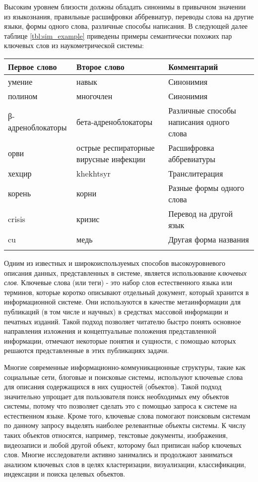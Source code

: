 Высоким уровнем близости должны обладать синонимы в привычном значении из языкознания, правильные расшифровки аббревиатур, переводы слова на другие языки, формы одного слова, различные способы написания. В следующей далее таблице \ref{tbl:sim_example} приведены примеры семантически похожих пар ключевых слов из наукометрической системы:
\begin{tabularx}{16cm}{|X|X|X|}
        \hline
        Первое слово & Второе слово & Комментарий \\ \hline
        умение & навык & Синонимия \\ \hline
        полином & многочлен & Синонимия \\ \hline
        β-адреноблокаторы & бета-адреноблокаторы & Различные способы написания одного слова \\ \hline
        орви & острые респираторные вирусные инфекции & Расшифровка аббревиатуры \\ \hline
        хехцир & khekhtsyr & Транслитерация \\ \hline
        корень & корни & Разные формы одного слова \\ \hline
        crisis & кризис & Перевод на другой язык \\ \hline
        cu & медь & Другая форма названия \\ \hline
\caption{Примеры семантически близких ключевых слов} \label{tbl:tuple_test}
        \label{tbl:sim_example}
\end{tabularx}

Одним из известных и широкоиспользуемых способов высокоуровневого описания данных, представленных в системе, является использование \emph{ключевых слов}. Ключевые слова (или теги) - это набор слов естественного языка или терминов, которые коротко описывают отдельный документ, который хранится в информационной системе. Они используются в качестве метаинформации для публикаций (в том числе и научных) в средствах массовой информации и печатных изданий. Такой подход позволяет читателю быстро понять основное направления изложения и концептуальные положения представленной информации, отмечают некоторые понятия и сущности, с помощью которых решаются представленные в этих публикациях задачи. 

Многие современные информационно-коммуникационные структуры, такие как социальные сети, блоговые и поисковые системы, используют ключевые слова для описания содержащихся в них сущностей (объектов). Такой подход значительно упрощает для пользователя поиск необходимых ему объектов системы, потому что позволяет сделать это с помощью запроса к системе на естественном языке. Кроме того, ключевые слова помогают поисковым системам по данному запросу выделять наиболее релевантные объекты системы. К числу таких объектов относятся, например, текстовые документы, изображения, видеозаписи и любой другой объект, которому был приписан набор ключевых слов. Многие исследователи активно занимались и продолжают заниматься анализом ключевых слов в целях кластеризации, визуализации, классификации, индексации и поиска целевых объектов.

